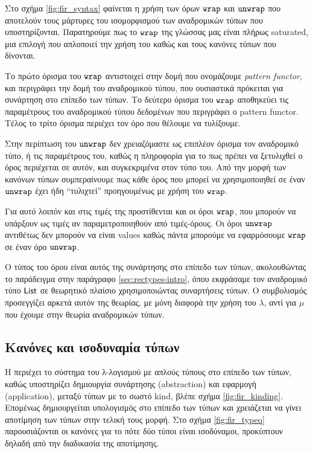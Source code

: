 Στο σχήμα \ref{fig:fir_syntax} φαίνεται η χρήση των όρων $\operatorname{\texttt{wrap}}$ και $\operatorname{\texttt{unwrap}}$
που αποτελούν τους μάρτυρες του ισομορφισμού των αναδρομικών τύπων που
υποστηρίζονται. Παρατηρούμε πως το $\operatorname{\texttt{wrap}}$ της γλώσσας μας είναι πλήρως
saturated, μια επιλογή που απλοποιεί την χρήση του καθώς και τους κανόνες τύπων
που δίνονται.

Το πρώτο όρισμα του $\operatorname{\texttt{wrap}}$ αντιστοιχεί στην δομή που ονομάζουμε \emph{pattern
functor}, και περιγράφει την δομή του αναδρομικού τύπου, που ουσιαστικά
πρόκειται για συνάρτηση στο επίπεδο των τύπων.  Το δεύτερο όρισμα του $\operatorname{\texttt{wrap}}$
αποθηκεύει τις παραμέτρους του αναδρομικού τύπου δεδομένων που περιγράφει ο
pattern functor. Τέλος το τρίτο όρισμα περιέχει τον όρο που θέλουμε να
τυλίξουμε.

Στην περίπτωση του $\operatorname{\texttt{unwrap}}$ δεν χρειαζόμαστε ως επιπλέον όρισμα τον αναδρομικό
τύπο, ή τις παραμέτρους του, καθώς η πληροφορία για το πως πρέπει να ξετυλιχθεί
ο όρος περιέχεται σε αυτόν, και συγκεκριμένα στον τύπο του. Από την μορφή των
κανόνων τύπων συμπεραίνουμε πως κάθε όρος που μπορεί να χρησιμοποιηθεί σε έναν
$\operatorname{\texttt{unwrap}}$ έχει ήδη ``τυλιχτεί'' προηγουμένως με χρήση του $\operatorname{\texttt{wrap}}$.

Για αυτό λοιπόν και στις τιμές της \FOMF{} προστίθενται και οι όροι $\operatorname{\texttt{wrap}}$,
που μπορούν να υπάρξουν ως τιμές αν παραμετροποιηθούν από τιμές-όρους. Οι όροι
$\operatorname{\texttt{unwrap}}$ αντιθέτως δεν μπορούν να είναι values καθώς πάντα μπορούμε να
εφαρμόσουμε $\operatorname{\texttt{wrap}}$ σε έναν όρο $\operatorname{\texttt{unwrap}}$.

Ο τύπος του όρου είναι αυτός της συνάρτησης στο επίπεδο των τύπων, ακολουθώντας
το παράδειγμα στην παράγραφο \ref{sec:rectypes-intro}, όπου εκφράσαμε τον
αναδρομικό τύπο $\operatorname{\textsf{List}}$ σε θεωρητικό πλαίσιο χρησιμοποιώντας συναρτήσεις τύπων.
Ο συμβολισμός προσεγγίζει αρκετά αυτόν της θεωρίας, με μόνη διαφορά την χρήση
του $\lambda$, αντί για $\mu$ που έχουμε στην θεωρία αναδρομικών τύπων.




\subsection{Κανόνες και ισοδυναμία τύπων}

H \FOMF{} περιέχει το σύστημα του λ-λογισμού με απλούς τύπους στο επίπεδο των
τύπων, καθώς υποστηρίζει δημιουργία συνάρτησης (abstraction) και εφαρμογή
(application), μεταξύ τύπων με το σωστό kind, βλέπε σχήμα
\ref{fig:fir_kinding}. Επομένως δημιουργείται υπολογισμός στο επίπεδο των τύπων
και χρειάζεται να γίνει αποτίμηση των τύπων στην τελική τους μορφή. Στο σχήμα
\ref{fig:fir_typeq} παρουσιάζονται οι κανόνες για το πότε δύο τύποι είναι
ισοδύναμοι, προκύπτουν δηλαδή από την διαδικασία της αποτίμησης.

